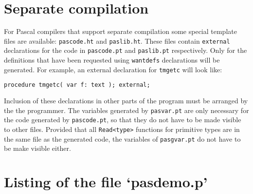 \documentclass{article}
\newcommand{\Pascal}{\sf Pascal}
\newenvironment{listing}{\small\begin{flushleft}}{\end{flushleft}}
\begin{document}
\section{Separate compilation}
\label{s.sepcomp}
For {\Pascal} compilers that support separate compilation some special
template files are available: {\tt pascode.ht} and {\tt paslib.ht}.
These files contain {\tt external} declarations for the code in {\tt pascode.pt}
and {\tt paslib.pt} respectively.
Only for the definitions that have been requested using {\tt wantdefs}
declarations will be generated.
For example, an external declaration for {\tt tmgetc} will look like:
\begin{verbatim}
procedure tmgetc( var f: text ); external;
\end{verbatim}
Inclusion of these declarations in other parts of the program must be
arranged by the the programmer.
The variables generated by {\tt pasvar.pt} are only necessary
for the code generated by {\tt pascode.pt},
so that they do not have to be made visible to other files.
Provided that all {\tt Read<type>} functions for primitive
types are in the same file as the generated code,
the variables of {\tt pasgvar.pt} do not have to be make visible either.
\printindex
\appendix
\section{Listing of the file `pasdemo.p'}
\label{s.pasdemo}
\begin{listing}

\end{listing}
\end{document}
